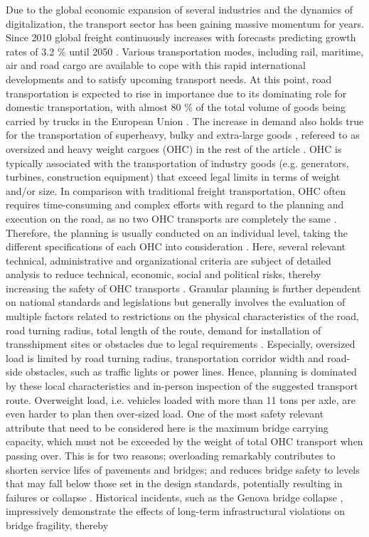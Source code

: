
Due to the global economic expansion of several industries and the dynamics of digitalization, the transport sector has been gaining massive momentum for years. Since 2010 global freight continuously increases with forecasts predicting growth rates of 3.2 \% until 2050 \cite{figura2020preferences, InternationalTransportForum}. Various transportation modes, including rail, maritime, air and road cargo are available to cope with this rapid international developments and to satisfy upcoming transport needs. At this point, road transportation is expected to rise in importance due to its dominating role for domestic transportation, with almost 80 \% of the total volume of goods being carried by trucks in the European Union \cite{Eurostat}. The increase in demand also holds true for the transportation of superheavy, bulky and extra-large goods \cite{gavrilova2021analysis}, refereed to as oversized and heavy weight cargoes (OHC) in the rest of the article \cite{Luo.2021}. OHC is typically associated with the transportation of industry goods (e.g. generators, turbines, construction equipment) that exceed legal limits in terms of weight and/or size. In comparison with traditional freight transportation, OHC often requires time-consuming and complex efforts with regard to the planning and execution on the road, as no two OHC transports are completely the same \cite{Wolnowska.2019}. Therefore, the planning is usually conducted on an individual level, taking the different specifications of each OHC into consideration \cite{Bazaras.2013}. Here, several relevant technical, administrative and organizational criteria are subject of detailed analysis to reduce technical, economic, social and political risks, thereby increasing the safety of OHC transports \cite{Palsaitis.2012}. Granular planning is further dependent on national standards and legislations but generally involves the evaluation of multiple factors related to restrictions on the physical characteristics of the road, road turning radius, total length of the route, demand for installation of transshipment sites or obstacles due to legal requirements \cite{PETRASKA.2018}. Especially, oversized load is limited by road turning radius, transportation corridor width and road-side obstacles, such as traffic lights or power lines. Hence, planning is dominated by these local characteristics and in-person inspection of the suggested transport route. Overweight load, i.e. vehicles loaded with more than 11 tons per axle, are even harder to plan then over-sized load. One of the most safety relevant attribute that need to be considered here is the maximum bridge carrying capacity, which must not be exceeded by the weight of total OHC transport when passing over. This is for two reasons; overloading remarkably contributes to shorten service lifes of pavements and bridges; and reduces bridge safety to levels that may fall below those set in the design standards, potentially resulting in failures or collapse \cite{fiorillo2018fragility}. Historical incidents, such as the Genova bridge collapse \cite{Morgese.2020, MorandiNYTimes}, impressively demonstrate the effects of long-term infrastructural violations on bridge fragility, thereby 